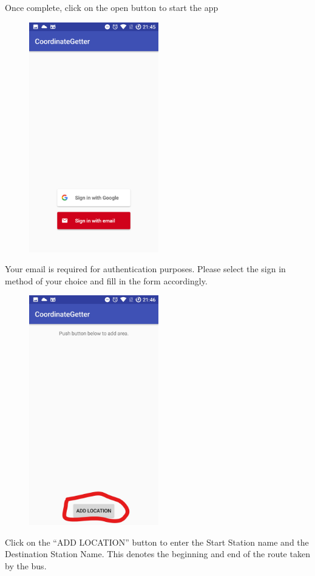 \documentclass[fontsize=25pt]{scrbook}
\begin{document}
	Once complete, click on the open button to start the app
	\newpage
	\begin{center}
\begin{figure}
		\includegraphics[height=10cm]{Screenshot_8.png}
		
		\end{figure}
	\end{center}
	Your email is required for authentication purposes. Please select the sign in method of your choice and fill in the form accordingly.
	\newpage
	\begin{center}
\begin{figure}
		\includegraphics[height=10cm]{Screenshot_9_LI.jpg}
		
		\end{figure}
	\end{center}
	Click on the ``ADD LOCATION'' button to enter the Start Station name and the Destination Station Name. This denotes the beginning and end of the route taken by the bus.
	
\end{document}
